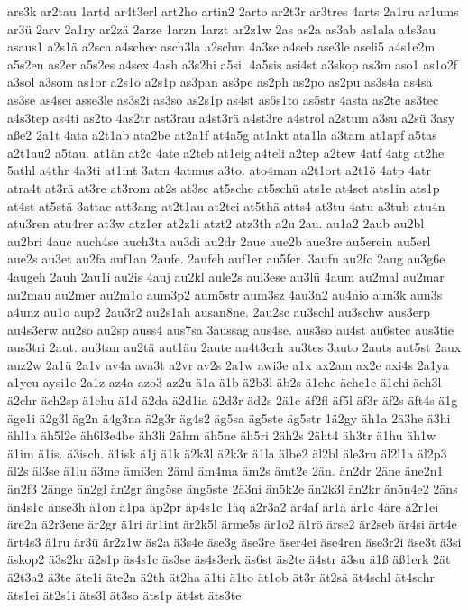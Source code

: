 {ars3k
ar2tau
1artd
ar4t3erl
art2ho
artin2
2arto
ar2t3r
ar3tres
4arts
2a1ru
ar1ums
ar3ü
2arv
2a1ry
ar2zä
2arze
1arzn
1arzt
ar2z1w
2as
as2a
as3ab
as1ala
a4s3au
asaus1
a2s1ä
a2sca
a4schec
asch3la
a2schm
4a3se
a4seb
ase3le
aseli5
a4s1e2m
a5s2en
as2er
a5s2es
a4sex
4ash
a3s2hi
a5si.
4a5sis
asi4st
a3skop
as3m
aso1
as1o2f
a3sol
a3som
as1or
a2s1ö
a2s1p
as3pan
as3pe
as2ph
as2po
as2pu
as3s4a
as4sä
as3se
as4sei
asse3le
as3s2i
as3so
as2s1p
as4st
as6s1to
as5str
4asta
as2te
as3tec
a4s3tep
as4ti
as2to
4as2tr
ast3rau
a4st3rä
a4st3re
a4strol
a2stum
a3su
a2sü
3asy
aße2
2a1t
4ata
a2t1ab
ata2be
at2a1f
at4a5g
at1akt
ata1la
a3tam
at1apf
a5tas
a2t1au2
a5tau.
at1än
at2c
4ate
a2teb
at1eig
a4teli
a2tep
a2tew
4atf
4atg
at2he
5athl
a4thr
4a3ti
at1int
3atm
4atmus
a3to.
ato4man
a2t1ort
a2t1ö
4atp
4atr
atra4t
at3rä
at3re
at3rom
at2s
at3sc
at5sche
at5schü
ats1e
at4set
ats1in
ats1p
at4st
at5stä
3attac
att3ang
at2t1au
at2tei
at5thä
atts4
at3tu
4atu
a3tub
atu4n
atu3ren
atu4rer
at3w
atz1er
at2z1i
atzt2
atz3th
a2u
2au.
au1a2
2aub
au2bl
au2bri
4auc
auch4se
auch3ta
au3di
au2dr
2aue
aue2b
aue3re
au5erein
au5erl
aue2s
au3et
au2fa
auf1an
2aufe.
2aufeh
auf1er
au5fer.
3aufn
au2fo
2aug
au3g6e
4augeh
2auh
2au1i
au2is
4auj
au2kl
aule2s
aul3ese
au3lü
4aum
au2mal
au2mar
au2mau
au2mer
au2m1o
aum3p2
aum5str
aum3sz
4au3n2
au4nio
aun3k
aun3s
a4unz
au1o
aup2
2au3r2
au2s1ah
ausan8ne.
2au2sc
au3schl
au3schw
aus3erp
au4s3erw
au2so
au2sp
auss4
aus7sa
3aussag
aus4se.
aus3so
au4st
au6stec
aus3tie
aus3tri
2aut.
au3tan
au2tä
aut1äu
2aute
au4t3erh
au3tes
3auto
2auts
aut5st
2aux
auz2w
2a1ü
2a1v
av4a
ava3t
a2vr
av2s
2a1w
awi3e
a1x
ax2am
ax2e
axi4s
2a1ya
a1yeu
aysi1e
2a1z
az4a
azo3
az2u
ä1a
ä1b
ä2b3l
äb2s
ä1che
äche1e
ä1chi
äch3l
ä2chr
äch2sp
ä1chu
ä1d
ä2da
ä2d1ia
ä2d3r
äd2s
2ä1e
äf2fl
äf5l
äf3r
äf2s
äft4s
ä1g
äge1i
ä2g3l
äg2n
ä4g3na
ä2g3r
äg4s2
äg5sa
äg5ste
äg5str
1ä2gy
äh1a
2ä3he
ä3hi
ähl1a
äh5l2e
äh6l3e4be
äh3li
2ähm
äh5ne
äh5ri
2äh2s
2äht4
äh3tr
ä1hu
äh1w
ä1im
ä1is.
ä3isch.
ä1isk
ä1j
ä1k
ä2k3l
ä2k3r
ä1la
älbe2
äl2bl
äle3ru
äl2l1a
äl2p3
äl2s
äl3se
ä1lu
ä3me
ämi3en
2äml
äm4ma
äm2s
ämt2e
2än.
än2dr
2äne
äne2n1
än2f3
2änge
än2gl
än2gr
äng5se
äng5ste
2ä3ni
än5k2e
än2k3l
än2kr
än5n4e2
2äns
än4s1c
änse3h
ä1on
ä1pa
äp2pr
äp4s1c
1äq
ä2r3a2
är4af
är1ä
är1c
4äre
ä2r1ei
äre2n
ä2r3ene
är2gr
ä1ri
är1int
är2k5l
ärme5s
är1o2
ä1rö
ärse2
är2seb
är4si
ärt4e
ärt4s3
ä1ru
är3ü
är2z1w
äs2a
ä3s4e
äse3g
äse3re
äser4ei
äse4ren
äse3r2i
äse3t
ä3si
äskop2
ä3s2kr
ä2s1p
äs4s1c
äs3se
äs4s3erk
äs6st
äs2te
ä4str
ä3su
ä1ß
äß1erk
2ät
ä2t3a2
ä3te
äte1i
äte2n
ä2th
ät2ha
ä1ti
ä1to
ät1ob
ät3r
ät2sä
ät4schl
ät4schr
äts1ei
ät2s1i
äts3l
ät3so
äts1p
ät4st
äts3te
}
